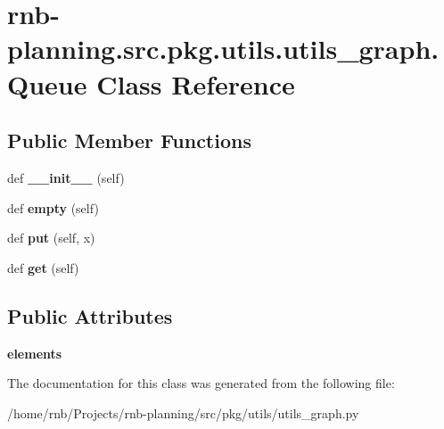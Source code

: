 \hypertarget{classrnb-planning_1_1src_1_1pkg_1_1utils_1_1utils__graph_1_1_queue}{}\section{rnb-\/planning.src.\+pkg.\+utils.\+utils\+\_\+graph.\+Queue Class Reference}
\label{classrnb-planning_1_1src_1_1pkg_1_1utils_1_1utils__graph_1_1_queue}
\subsection*{Public Member Functions}
\begin{DoxyCompactItemize}
\item 
\mbox{\label{classrnb-planning_1_1src_1_1pkg_1_1utils_1_1utils__graph_1_1_queue_aa6cf2ff4c7ee7a044a7b75a6e1cdb9d8}} 
def {\bfseries \+\_\+\+\_\+init\+\_\+\+\_\+} (self)
\item 
\mbox{\label{classrnb-planning_1_1src_1_1pkg_1_1utils_1_1utils__graph_1_1_queue_a831ef3a3098ff4a77c2784f063411c2c}} 
def {\bfseries empty} (self)
\item 
\mbox{\label{classrnb-planning_1_1src_1_1pkg_1_1utils_1_1utils__graph_1_1_queue_ae9b0e19299010de5ff4a4c825e14bbb0}} 
def {\bfseries put} (self, x)
\item 
\mbox{\label{classrnb-planning_1_1src_1_1pkg_1_1utils_1_1utils__graph_1_1_queue_a2e13abe7b7bff7f1ad9a0b5d9098176a}} 
def {\bfseries get} (self)
\end{DoxyCompactItemize}
\subsection*{Public Attributes}
\begin{DoxyCompactItemize}
\item 
\mbox{\label{classrnb-planning_1_1src_1_1pkg_1_1utils_1_1utils__graph_1_1_queue_a40958a5027a496ee648dc68e16b7c772}} 
{\bfseries elements}
\end{DoxyCompactItemize}


The documentation for this class was generated from the following file\+:\begin{DoxyCompactItemize}
\item 
/home/rnb/\+Projects/rnb-\/planning/src/pkg/utils/utils\+\_\+graph.\+py\end{DoxyCompactItemize}
